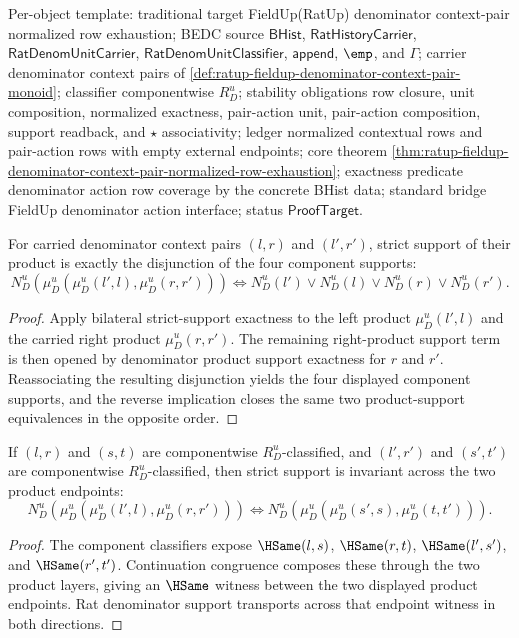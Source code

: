 Per-object template: traditional target FieldUp(RatUp) denominator
context-pair normalized row exhaustion; BEDC source $\mathsf{BHist}$,
$\mathsf{RatHistoryCarrier}$, $\mathsf{RatDenomUnitCarrier}$,
$\mathsf{RatDenomUnitClassifier}$, $\mathsf{append}$, $\emp$, and $\Gamma$;
carrier denominator context pairs of
\autoref{def:ratup-fieldup-denominator-context-pair-monoid}; classifier
componentwise $R_D^u$; stability obligations row closure, unit composition,
normalized exactness, pair-action unit, pair-action composition, support
readback, and $\star$ associativity; ledger normalized contextual rows and
pair-action rows with empty external endpoints; core theorem
\autoref{thm:ratup-fieldup-denominator-context-pair-normalized-row-exhaustion};
exactness predicate denominator action row coverage by the concrete BHist data;
standard bridge FieldUp denominator action interface; status
$\mathsf{ProofTarget}$.

\begin{theorem}
\label{thm:field-rat-denominator-context-pair-product-strict-support}
For carried denominator context pairs $(l,r)$ and $(l',r')$, strict support of
their product is exactly the disjunction of the four component supports:
$$
N_D^u(\mu_D^u(\mu_D^u(l',l),\mu_D^u(r,r')))
\Longleftrightarrow
N_D^u(l')\lor N_D^u(l)\lor N_D^u(r)\lor N_D^u(r').
$$
\end{theorem}
\begin{proof}
Apply bilateral strict-support exactness to the left product
$\mu_D^u(l',l)$ and the carried right product $\mu_D^u(r,r')$. The remaining
right-product support term is then opened by denominator product support
exactness for $r$ and $r'$. Reassociating the resulting disjunction yields the
four displayed component supports, and the reverse implication closes the same
two product-support equivalences in the opposite order.
\end{proof}

\begin{theorem}
\label{thm:field-rat-denominator-context-pair-product-strict-support-transport}
If $(l,r)$ and $(s,t)$ are componentwise $R_D^u$-classified, and
$(l',r')$ and $(s',t')$ are componentwise $R_D^u$-classified, then strict
support is invariant across the two product endpoints:
$$
N_D^u(\mu_D^u(\mu_D^u(l',l),\mu_D^u(r,r')))
\Longleftrightarrow
N_D^u(\mu_D^u(\mu_D^u(s',s),\mu_D^u(t,t'))).
$$
\end{theorem}
\begin{proof}
The component classifiers expose $\HSame(l,s)$, $\HSame(r,t)$,
$\HSame(l',s')$, and $\HSame(r',t')$. Continuation congruence composes these
through the two product layers, giving an $\HSame$ witness between the two
displayed product endpoints. Rat denominator support transports across that
endpoint witness in both directions.
\end{proof}

